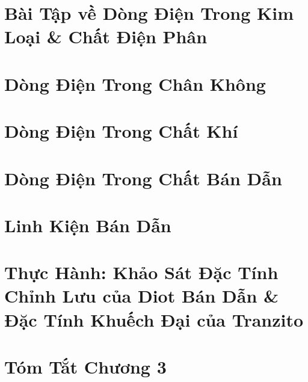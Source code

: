 \documentclass[oneside]{book}
\numberwithin{equation}{section}
\begin{document}

\section{Bài Tập về Dòng Điện Trong Kim Loại \& Chất Điện Phân}


\section{Dòng Điện Trong Chân Không}


\section{Dòng Điện Trong Chất Khí}


\section{Dòng Điện Trong Chất Bán Dẫn}


\section{Linh Kiện Bán Dẫn}


\section{Thực Hành: Khảo Sát Đặc Tính Chỉnh Lưu của Diot Bán Dẫn \& Đặc Tính Khuếch Đại của Tranzito}


\section{Tóm Tắt Chương 3}

\end{document}
